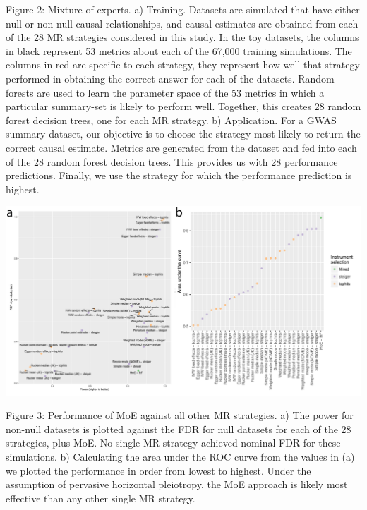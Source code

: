 \documentclass[]{article}
\begin{document}
Figure 2: Mixture of experts. a) Training. Datasets are simulated that
have either null or non-null causal relationships, and causal estimates
are obtained from each of the 28 MR strategies considered in this study.
In the toy datasets, the columns in black represent 53 metrics about
each of the 67,000 training simulations. The columns in red are specific
to each strategy, they represent how well that strategy performed in
obtaining the correct answer for each of the datasets. Random forests
are used to learn the parameter space of the 53 metrics in which a
particular summary-set is likely to perform well. Together, this creates
28 random forest decision trees, one for each MR strategy. b)
Application. For a GWAS summary dataset, our objective is to choose the
strategy most likely to return the correct causal estimate. Metrics are
generated from the dataset and fed into each of the 28 random forest
decision trees. This provides us with 28 performance predictions.
Finally, we use the strategy for which the performance prediction is
highest.

\newpage

\includegraphics{images/fig3.pdf}

Figure 3: Performance of MoE against all other MR strategies. a) The
power for non-null datasets is plotted against the FDR for null datasets
for each of the 28 strategies, plus MoE. No single MR strategy achieved
nominal FDR for these simulations. b) Calculating the area under the ROC
curve from the values in (a) we plotted the performance in order from
lowest to highest. Under the assumption of pervasive horizontal
pleiotropy, the MoE approach is likely most effective than any other
single MR strategy.

\newpage
\end{document}
